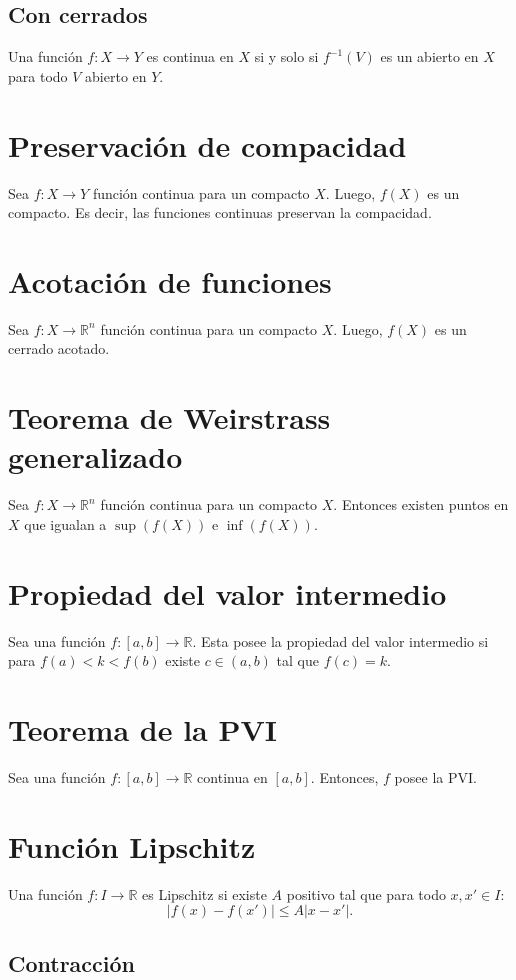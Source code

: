 \documentclass{article}
\begin{document}
\subsection*{Con cerrados}
Una función $f:X\to Y$ es continua en $X$ si y solo si $f^{-1}(V)$ es un abierto en $X$ para todo $V$ abierto en $Y$. 

\section*{Preservación de compacidad}
Sea $f:X\to Y$ función continua para un compacto $X$. Luego, $f(X)$ es un compacto. Es decir, las funciones continuas preservan la compacidad.

\section*{Acotación de funciones}
Sea $f:X\to \mathbb{R}^n$ función continua para un compacto $X$. Luego, $f(X)$ es un cerrado acotado.

\section*{Teorema de Weirstrass generalizado}
Sea $f:X\to \mathbb{R}^n$ función continua para un compacto $X$. Entonces existen puntos en $X$ que igualan a $\sup(f(X))$ e $\inf(f(X))$.

\section*{Propiedad del valor intermedio}

Sea una función $f:[a,b]\to\mathbb{R}$. Esta posee la propiedad del valor intermedio si para $f(a)<k<f(b)$ existe $c\in(a,b)$ tal que $f(c)=k$.

\section*{Teorema de la PVI}
Sea una función $f:[a,b]\to\mathbb{R}$ continua en $[a,b]$. Entonces, $f$ posee la PVI.

\section*{Función Lipschitz}

Una función $f:I\to\mathbb{R}$ es Lipschitz si existe $A$ positivo tal que para todo $x,x'\in I$:
$$|f(x)-f(x')|\leq A|x-x'|.$$

\subsection*{Contracción}
\end{document}
